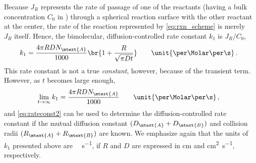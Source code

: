 \documentclass[nobib,nofonts,nols,nohyper]{tufte-handout}
\begin{document}
Because \( J_R \) represents the rate of passage of one of the reactants (having a bulk concentration \( C_0 \) in \unit{\Molar}) through a spherical reaction surface with the other reactant at the center, the rate of the reaction represented by \cref{eq:rxn_scheme} is merely \( J_R \) itself. 
Hence, the bimolecular, diffusion-controlled rate constant \( k_1 \) is \( J_R/C_0 \),
\begin{equation}
	k_1 = \frac{4 \pi R D N_\mtext{A}}{1000} \br{ 1 + \frac{R}{\sqrt{\pi D t}}} \qquad \unit{\per\Molar \per\s} \, .
	\label{eq:rateconst1}
\end{equation} 
This rate constant is not a true \emph{constant}, however, because of the transient term. 
However, as \( t \) becomes large enough,
\begin{equation}
	\lim_{t \to \infty} k_1 = \frac{4 \pi R D N_\mtext{A}}{1000} \qquad \unit{\per\Molar \per\s} \, ,
	\label{eq:rateconst2}
\end{equation}
and \cref{eq:rateconst2} can be used to determine the diffusion-controlled rate constant if the mutual diffusion constant \( (D_\mtext{A} + D_\mtext{B}) \) and collision radii \( (R_\mtext{A} + R_\mtext{B}) \) are known.%
We emphasize again that the units of \( k_1 \) presented above are \unit{\per\Molar \per \s}, if \( R \) and \( D \) are expressed in \unit{\cm} and \unit{\cm\squared \per \s}, respectively. 
\end{document}

